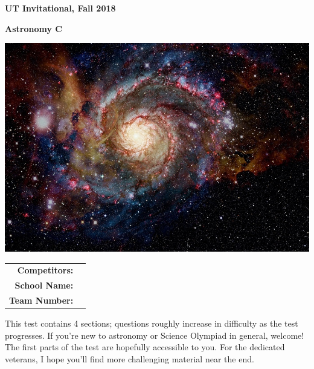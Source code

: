 \documentclass{exam}
\begin{document}
\begin{coverpages}
	\begin{center}
		\vspace{0.05 in}
		\par\noindent\textbf{\large  UT Invitational, Fall 2018}
		\vspace{0.05 in}
		\vspace{0.10 in}
		\par\noindent\textbf{\Huge   Astronomy C}
		\vspace{0.25 in}
		\par\noindent
		\vspace{0.05 in}
		\par\noindent
				\includegraphics[width=.7\textwidth]{images/cover.jpg}
		\vspace{0.05 in}
		\vspace{0.25 in}
		\vspace{0.10 in}
		\vspace{0.15 in}
		\par
		\def\arraystretch{2}\tabcolsep=3pt
		\begin{tabular}{r r}
			\textbf{Competitors:} & \makebox[4in]{\hrulefill} \\
			\textbf{School Name:} & \makebox[4in]{\hrulefill} \\
			\textbf{Team Number:} & \makebox[4in]{\hrulefill} \\
		\end{tabular}
		\vspace{0.15 in}
	\end{center}
		\vspace{0.10 in}
	\par\noindent This test contains 4 sections; questions roughly increase in difficulty as the test progresses. If you're new to astronomy or Science Olympiad in general, welcome! The first parts of the test are hopefully accessible to you. For the dedicated veterans, I hope you'll find more challenging material near the end.

\end{coverpages}
\end{document}
